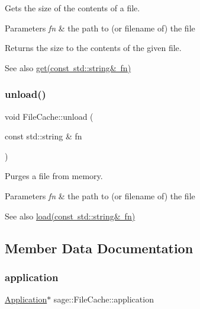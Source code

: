 Gets the size of the contents of a file. 


\begin{DoxyParams}{Parameters}
{\em fn} & the path to (or filename of) the file \\
\hline
\end{DoxyParams}
\begin{DoxyReturn}{Returns}
the size to the contents of the given file. 
\end{DoxyReturn}
\begin{DoxySeeAlso}{See also}
\mbox{\hyperlink{classsage_1_1FileCache_a67fe1af6ccb8d06b7e97dc54a1836eee}{get(const std\+::string\& fn)}} 
\end{DoxySeeAlso}
\mbox{\label{classsage_1_1FileCache_a902a36451f11c4b6e4267358bfadb024}} 
\subsubsection{\texorpdfstring{unload()}{unload()}}
{\footnotesize\ttfamily void File\+Cache\+::unload (\begin{DoxyParamCaption}\item[{const std\+::string \&}]{fn }\end{DoxyParamCaption})}



Purges a file from memory. 


\begin{DoxyParams}{Parameters}
{\em fn} & the path to (or filename of) the file \\
\hline
\end{DoxyParams}
\begin{DoxySeeAlso}{See also}
\mbox{\hyperlink{classsage_1_1FileCache_addb15593e848f038a5d7a7c6c3828053}{load(const std\+::string\& fn)}} 
\end{DoxySeeAlso}


\subsection{Member Data Documentation}
\mbox{\label{classsage_1_1FileCache_a4ff6c40a790b7e9ed42c05a7dd426872}} 
\subsubsection{\texorpdfstring{application}{application}}
{\footnotesize\ttfamily \mbox{\hyperlink{classsage_1_1Application}{Application}}$\ast$ sage\+::\+File\+Cache\+::application\hspace{0.3cm}{\ttfamily [private]}}

